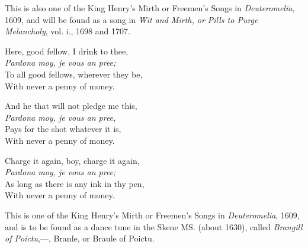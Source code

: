 \pagebreak


This is also one of the King Henry’s Mirth or Freemen’s Songs in \textit{Deuteromelia},
1609, and will be found as a song in \textit{Wit and Mirth, or Pills to Purge
Melancholy}, vol. i., 1698 and 1707.


\begin{dcverse}
\begin{altverse}
Here, good fellow, I drink to thee,\\
\textit{Pardona moy, je vous an pree;}\footnotemark\\
To all good fellows, wherever they be,\\
With never a penny of money.
\end{altverse}

\begin{altverse}
And he that will not pledge me this,\\
\textit{Pardona moy, je vous an pree,}\\
Pays for the shot whatever it is,\\
With never a penny of money.
\end{altverse}
\end{dcverse}


\begin{scverse}
\begin{altverse}
Charge it again, boy, charge it again,\\
\textit{Pardona moy, je vous an pree;}\\
As long as there is any ink in thy pen,\\
With never a penny of money.
\end{altverse}
\end{scverse}



This is one of the King Henry’s Mirth or Freemen’s Songs in \textit{Deuteromelia},
1609, and is to be found as a dance tune in the Skene MS. (about 1630), called
\textit{Brangill of Poictu},—\ie, Branle, or Braule of Poictu.

